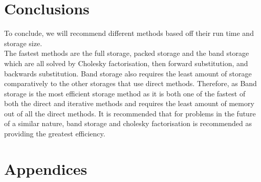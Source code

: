 \documentclass[12pt,a4paper]{article}
\begin{document}
\section{Conclusions}
To conclude, we will recommend different methods based off their run time and storage size.\\The fastest methods are the full storage, packed storage and the band storage which are all solved by Cholesky factorisation, then forward substitution, and backwards substitution. Band storage also requires the least amount of storage comparatively to the other storages that use direct methods. Therefore, as Band storage is the most efficient storage method as it is both one of the fastest of both the direct and iterative methods and requires the least amount of memory out of all the direct methods. It is recommended that for problems in the future of a similar nature, band storage and cholesky factorisation is recommended as providing the greatest efficiency.
\pagebreak
\section{Appendices}
\end{document}
